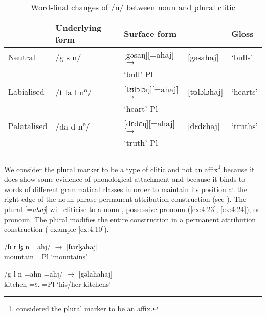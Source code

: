 \begin{table}
{\begin{tabular}{lllll}
\lsptoprule
& {Underlying form} & {Surface form} & &  {Gloss}\\\midrule
{Neutral } & /g s n/ & [gəsaŋ][=ahaj] \hspace{5pt}  $\rightarrow$  & [gəsahaj] & ‘bulls’\\
& & ‘bull’  \hspace{8pt}  Pl \\
{Labialised} & /t la l n\textsuperscript{o}/ & [tʊlɔlɔŋ][=ahaj] \hspace{3pt}  $\rightarrow$  & [tʊlɔlɔhaj] & ‘hearts’\\
& & ‘heart’ \hspace{8pt} Pl  \\
{Palatalised} & /da d n\textsuperscript{e}/ & [dɛdɛŋ][=ahaj] \hspace{5pt}  $\rightarrow$ & [dɛdɛhaj] & ‘truths’\\
& & ‘truth’ \hspace{5pt}  Pl \\
\lspbottomrule
\end{tabular}}
\caption{Word-final changes of /n/ between noun and plural clitic}\label{tab:28}
\end{table}

\newpage 
We consider the plural marker to be a type of clitic and not an affix\footnote{\citet{Bow1997c} considered the plural marker to be an affix. } because it does show some evidence of phonological attachment and because it binds to words of different grammatical classes in order to maintain its position at the right edge of the noun phrase permanent attribution construction (see ). The plural  [=\textit{ahaj}] will cliticise to a noun , possessive pronoun (\ref{ex:4:23}, \ref{ex:4:24}), or pronoun.  The plural modifies the entire construction in a permanent attribution construction ( example \ref{ex:4:10}). 

\ea \label{ex:4:22}
\textup{/ɓ r ɮ n \hspace{7pt} =ahj/     \hspace{36pt}   $\rightarrow$ \hspace{10pt}  [ɓərɮahaj]}\\
\glt  mountain     =Pl   \hspace{71pt}       ‘mountains’
\z

\ea \label{ex:4:23}
\textup{/g l n  \hspace{10pt}      =ahn    \hspace{12pt}      =ahj/  \hspace{3pt}  $\rightarrow$  \hspace{10pt} [gəlahahaj]}\\
\glt  kitchen  {}   =\textsc{s}.{\POSS}     =Pl  \hspace{38pt}    ‘his/her kitchens’
\z

